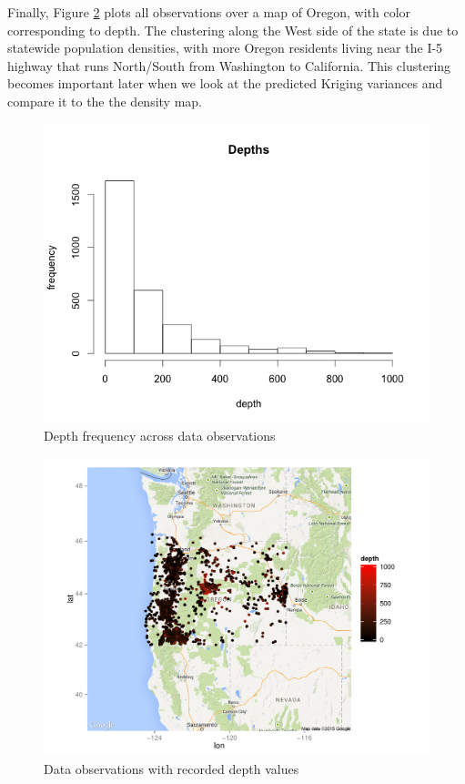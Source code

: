 \documentclass[12pt,twoside]{reedthesis}
\begin{document}
Finally, Figure \ref{points} plots all observations over a map of Oregon, with color corresponding to depth. The clustering along the West side of the state is due to statewide population densities, with more Oregon residents living near the I-5 highway that runs North/South from Washington to California. This clustering becomes important later when we look at the predicted Kriging variances and compare it to the the density map.

\begin{figure}[h]
	   
	       \centering
	  
	    \includegraphics[scale=0.6]{depth_hist}
	
	     \caption{Depth frequency across data observations}
	 \label{depths}
	\end{figure}

\begin{figure}[h]
	   
	       \centering
	  
	    \includegraphics[scale=0.8]{points_plot}
	
	     \caption{Data observations with recorded depth values}
	 \label{points}
	\end{figure}
\end{document}
